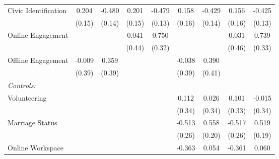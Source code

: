 \begin{table}[htbp]
\begin{tabular}{l*{8}{c}}
\hspace{0.25cm} Civic Identification&0.204         &-0.480\sym{**} &0.201         &-0.479\sym{***}&0.158         &-0.429\sym{**} &0.156         &-0.425\sym{**} \\
                              &(0.15)         &(0.14)         &(0.15)         &(0.13)         &(0.16)         &(0.14)         &(0.16)         &(0.13)         \\
\hspace{0.25cm} Online Engagement&              &              &0.041         &0.750\sym{*}  &              &              &0.031         &0.739\sym{*}  \\
                              &              &              &(0.44)         &(0.32)         &              &              &(0.46)         &(0.33)         \\
\hspace{0.25cm} Offline Engagement&-0.009         &0.359         &              &              &-0.038         &0.390         &              &              \\
                              &(0.39)         &(0.39)         &              &              &(0.39)         &(0.41)         &              &              \\
\emph{Controls:}              &              &              &              &              &              &              &              &              \\
\hspace{0.25cm} Volunteering  &              &              &              &              &0.112         &0.026         &0.101         &-0.015         \\
                              &              &              &              &              &(0.34)         &(0.34)         &(0.33)         &(0.34)         \\
\hspace{0.25cm} Marriage Status&              &              &              &              &-0.513         &0.558\sym{**} &-0.517         &0.519\sym{*}  \\
                              &              &              &              &              &(0.26)         &(0.20)         &(0.26)         &(0.19)         \\
\hspace{0.25cm} Online Workspace&              &              &              &              &-0.363         &0.054         &-0.361         &0.060         \\

\end{tabular}
\end{table}

